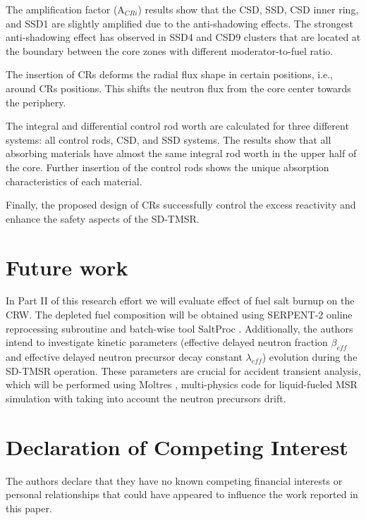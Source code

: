 The amplification factor (A$_{CRi}$) results show that the CSD, SSD, CSD inner ring, and SSD1 are slightly amplified due to the anti-shadowing effects. The strongest anti-shadowing effect has observed in SSD4 and CSD9 clusters that are located at the boundary between the core zones with different moderator-to-fuel ratio.

The insertion of CRs deforms the radial flux shape in certain positions, i.e., around CRs positions. This shifts the neutron flux from the core center towards the periphery.

The integral and differential control rod worth are calculated for three 
different systems: all control rods, CSD, and SSD systems. The results show 
that all absorbing materials have almost the same integral rod worth in the 
upper half of the core. Further insertion of the control rods shows the unique 
absorption characteristics of each material.

Finally, the proposed design of CRs successfully control the excess reactivity and enhance the safety aspects of the SD-TMSR.

\section{Future work}
In Part II of this research effort we will evaluate effect of fuel salt 
burnup on the CRW. The depleted fuel composition will be obtained using 
SERPENT-2 online reprocessing subroutine \cite{aufiero2013extended} and 
batch-wise tool SaltProc \cite{rykhlevskii_arfc/saltproc_2018, 
rykhlevskii_milestone_2019}. Additionally, the authors intend to investigate 
kinetic parameters (effective delayed neutron fraction $\beta_{eff}$ and 
effective delayed neutron precursor decay constant $\lambda_{eff}$) evolution 
during the SD-TMSR operation. These parameters are crucial for accident 
transient analysis, which will be performed using Moltres 
\cite{lindsay_introduction_2018}, multi-physics code for liquid-fueled MSR 
simulation with taking into account the neutron precursors drift.

\section{Declaration of Competing Interest}

The authors declare that they have no known competing financial interests or personal relationships that could have appeared to influence the work reported in this paper.
